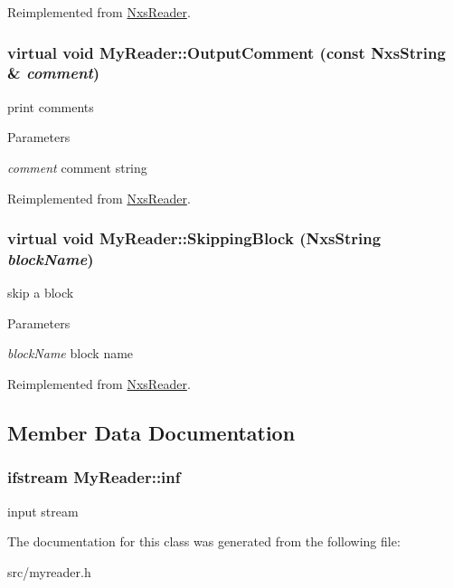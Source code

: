 Reimplemented from \hyperlink{classNxsReader}{NxsReader}.\hypertarget{classMyReader_a0860a9670236993a197ace29278b0eea}{
\subsubsection[{OutputComment}]{\setlength{\rightskip}{0pt plus 5cm}virtual void MyReader::OutputComment (const {\bf NxsString} \& {\em comment})}}
\label{classMyReader_a0860a9670236993a197ace29278b0eea}
print comments 
\begin{DoxyParams}{Parameters}
\item[{\em comment}]comment string \end{DoxyParams}


Reimplemented from \hyperlink{classNxsReader}{NxsReader}.\hypertarget{classMyReader_a81320d28a7b55fd8c56a949457640b99}{
\subsubsection[{SkippingBlock}]{\setlength{\rightskip}{0pt plus 5cm}virtual void MyReader::SkippingBlock ({\bf NxsString} {\em blockName})}}
\label{classMyReader_a81320d28a7b55fd8c56a949457640b99}
skip a block 
\begin{DoxyParams}{Parameters}
\item[{\em blockName}]block name \end{DoxyParams}


Reimplemented from \hyperlink{classNxsReader}{NxsReader}.

\subsection{Member Data Documentation}
\hypertarget{classMyReader_a324d60c6621c75e8ae83b4edab0344f8}{
\subsubsection[{inf}]{\setlength{\rightskip}{0pt plus 5cm}ifstream {\bf MyReader::inf}}}
\label{classMyReader_a324d60c6621c75e8ae83b4edab0344f8}
input stream 

The documentation for this class was generated from the following file:\begin{DoxyCompactItemize}
\item 
src/myreader.h\end{DoxyCompactItemize}

